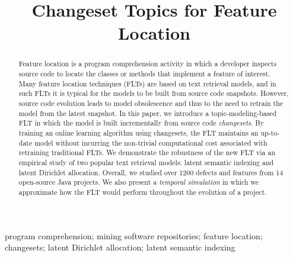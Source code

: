 \documentclass[conference]{IEEEtran}
\begin{document}
\title{Changeset Topics for Feature Location}
\author{

    \and

}


\maketitle

\begin{abstract}
Feature location is a program comprehension activity in which a developer
inspects source code to locate the classes or methods that implement a feature of interest.
Many feature location techniques (FLTs) are based on text retrieval models, and
in such FLTs it is typical for the models to be built from source code snapshots.
However, source code evolution leads to model obsolescence and
thus to the need to retrain the model from the latest snapshot.
In this paper, we introduce a topic-modeling-based FLT in which the model
is built incrementally from source code \emph{changesets}.
By training an online learning algorithm using changesets, the FLT
maintains an up-to-date model without incurring the non-trivial computational cost associated with retraining traditional FLTs.
We demonstrate the robustness of the new FLT via an empirical study of two popular text retrieval models:
latent semantic indexing and latent Dirichlet allocation.
Overall, we studied over 1200 defects and features from 14 open-source Java projects.
We also present a \emph{temporal simulation} in which we approximate how the FLT would perform throughout the evolution of a project.
\end{abstract}

\begin{IEEEkeywords}
program comprehension;
mining software repositories;
feature location;
changesets;
latent Dirichlet allocation;
latent semantic indexing
\end{IEEEkeywords}
\end{document}
